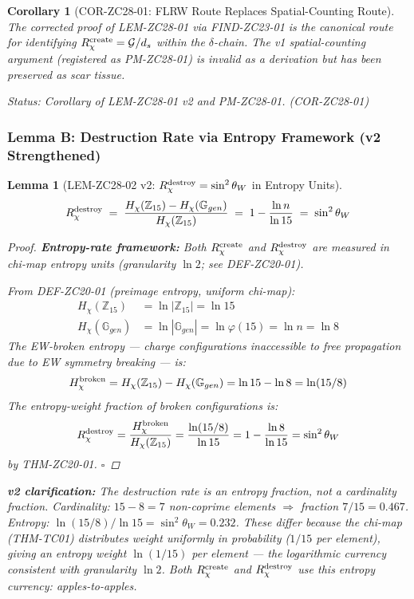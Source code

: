 \documentclass[12pt, a4paper]{article}
\newtheorem{lemma}{Lemma}[section]
\newtheorem{corollary}{Corollary}[section]
\begin{document}
\begin{corollary}[COR-ZC28-01: FLRW Route Replaces
  Spatial-Counting Route]
\label{zc28:cor:flrw}
The corrected proof of \textup{LEM-ZC28-01} via \textup{FIND-ZC23-01}
is the canonical route for identifying $R_\chi^{\rm create}
= \mathcal{G}/d_s$ within the $\delta$-chain.
The v1 spatial-counting argument (registered as \textup{PM-ZC28-01})
is invalid as a derivation but has been preserved as scar tissue.

\medskip
\textit{Status: Corollary of LEM-ZC28-01 v2 and PM-ZC28-01.}
\hfill\textup{(COR-ZC28-01)}
\end{corollary}

\subsubsection{Lemma B: Destruction Rate via Entropy Framework (v2 Strengthened)}

\begin{lemma}[LEM-ZC28-02 v2: $R_\chi^{\rm destroy}
  = \sin^2\theta_W$ in Entropy Units]
\label{zc28:lem:destroy}
\[
  R_\chi^{\rm destroy}
  \;=\; \frac{H_\chi(\mathbb{Z}_{15}) - H_\chi(\mathbb{G}_{gen})}
             {H_\chi(\mathbb{Z}_{15})}
  \;=\; 1 - \frac{\ln n}{\ln 15}
  \;=\; \sin^2\theta_W
\]

\begin{proof}
\textbf{Entropy-rate framework:} Both $R_\chi^{\rm create}$ and
$R_\chi^{\rm destroy}$ are measured in chi-map entropy units
(granularity $\ln 2$; see DEF-ZC20-01).

From DEF-ZC20-01 (preimage entropy, uniform chi-map):
\begin{align}
  H_\chi(\mathbb{Z}_{15})
    &= \ln|\mathbb{Z}_{15}| = \ln 15 \\[4pt]
  H_\chi(\mathbb{G}_{gen})
    &= \ln|\mathbb{G}_{gen}| = \ln\varphi(15) = \ln n = \ln 8
\end{align}
The EW-broken entropy --- charge configurations inaccessible
to free propagation due to EW symmetry breaking --- is:
\[
  H_\chi^{\rm broken}
  = H_\chi(\mathbb{Z}_{15}) - H_\chi(\mathbb{G}_{gen})
  = \ln 15 - \ln 8
  = \ln(15/8)
\]
The entropy-weight fraction of broken configurations is:
\[
  R_\chi^{\rm destroy}
  = \frac{H_\chi^{\rm broken}}{H_\chi(\mathbb{Z}_{15})}
  = \frac{\ln(15/8)}{\ln 15}
  = 1 - \frac{\ln 8}{\ln 15}
  = \sin^2\theta_W
\]
by THM-ZC20-01.
\hfill$\square$
\end{proof}

\medskip
\textbf{v2 clarification:} The destruction rate is an
\emph{entropy fraction}, not a cardinality fraction.
Cardinality: $15 - 8 = 7$ non-coprime elements $\Rightarrow$
fraction $7/15 = 0.467$.
Entropy: $\ln(15/8)/\ln 15 = \sin^2\theta_W = 0.232$.
These differ because the chi-map (THM-TC01) distributes weight
uniformly in probability ($1/15$ per element), giving an
entropy weight $\ln(1/15)$ per element --- the logarithmic
currency consistent with granularity $\ln 2$.
Both $R_\chi^{\rm create}$ and $R_\chi^{\rm destroy}$ use
this entropy currency: apples-to-apples.
\end{lemma}
\end{document}
